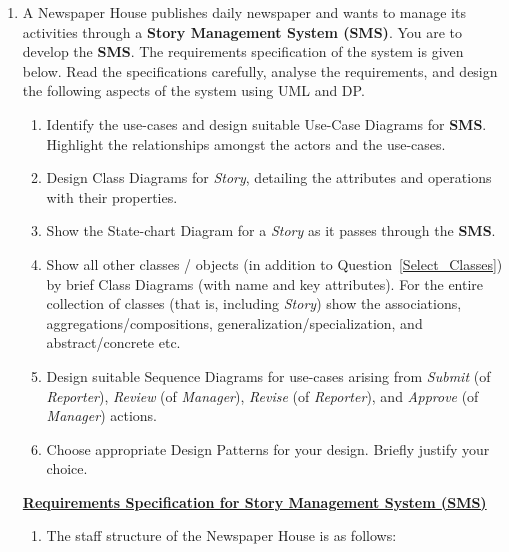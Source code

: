 \documentclass{article}
\begin{document}
\begin{enumerate}

\item A \textsf{Newspaper House} publishes daily newspaper and wants to manage its activities through a {\bf Story Management System (SMS)}. You are to develop the {\bf SMS}. The requirements specification of the system is given below. Read the specifications carefully, analyse the requirements, and design the following aspects of the system using UML and DP. 
\begin{enumerate}
\item \label{Use_Cases} Identify the use-cases and design suitable Use-Case Diagrams for {\bf SMS}. Highlight the relationships amongst the actors and the use-cases. %
\item \label{Select_Classes} Design Class Diagrams for {\em Story}, detailing the attributes and operations with their properties. %
\item \label{State-chart} Show the State-chart Diagram for a {\em Story} as it passes through the {\bf SMS}. %
\item \label{Class-Diagram} Show all other classes / objects (in addition to Question~\ref{Select_Classes}) by brief Class Diagrams (with name and key attributes). For the entire collection of classes (that is, including {\em Story}) show the associations, aggregations/compositions, generalization/specialization, and abstract/concrete etc. %
\item \label{Sequence-Diagrams} Design suitable Sequence Diagrams for use-cases arising from {\em Submit} (of {\em Reporter}), {\em Review} (of {\em Manager}), {\em Revise} (of {\em Reporter}), and {\em Approve} (of {\em Manager}) actions. %
\item \label{Design Patterns} Choose appropriate Design Patterns for your design. Briefly justify your choice. %
\end{enumerate}

\begin{center}
{\bf \underline{Requirements Specification for Story Management System (SMS)}}
\end{center}

\begin{enumerate}
\item The staff structure of the \textsf{Newspaper House} is as follows:

\begin{itemize}


\end{itemize}
\end{enumerate}
\end{enumerate}
\end{document}

